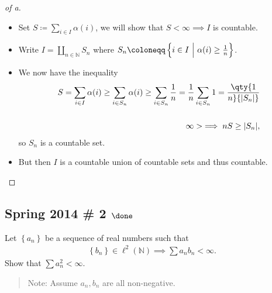 \begin{solution}

\envlist

\begin{proof}[of a]

\envlist

\begin{itemize}
\item
  Set \(S \coloneqq\sum_{i\in I} \alpha(i)\), we will show that
  \(S<\infty \implies I\) is countable.
\item
  Write \(I = {\coprod}_{n\in {\mathbb{N}}} S_n\) where
  \(S_n \coloneqq\left\{{i\in I {~\mathrel{\Big|}~}\alpha(i) \geq {1\over n}}\right\}\).
\item
  We now have the inequality
  \begin{align*}  
  S = \sum_{i\in I} \alpha(i) 
  \geq \sum_{i\in S_n} \alpha(i) 
  \geq \sum_{i\in S_n} {1\over n} 
  = {1\over n} \sum_{i\in S_n} 1 = \qty{1\over n} {\left\lvert {S_n} \right\rvert} \\ \\
  \infty > \implies n S \geq {\left\lvert {S_n} \right\rvert}
  ,\end{align*}
  so \(S_n\) is a countable set.
\item
  But then \(I\) is a countable union of countable sets and thus
  countable.
\end{itemize}

\end{proof}


\end{solution}

\hypertarget{spring-2014-2-done}{%
\subsection{\texorpdfstring{Spring 2014 \# 2
\(\done\)}{Spring 2014 \# 2 \textbackslash done}}\label{spring-2014-2-done}}

Let \(\left\{{a_n}\right\}\) be a sequence of real numbers such that
\begin{align*}
\left\{{b_n}\right\} \in \ell^2({\mathbb{N}}) \implies \sum a_n b_n < \infty.
\end{align*}
Show that \(\sum a_n^2 < \infty\).

\begin{quote}
Note: Assume \(a_n, b_n\) are all non-negative.
\end{quote}

